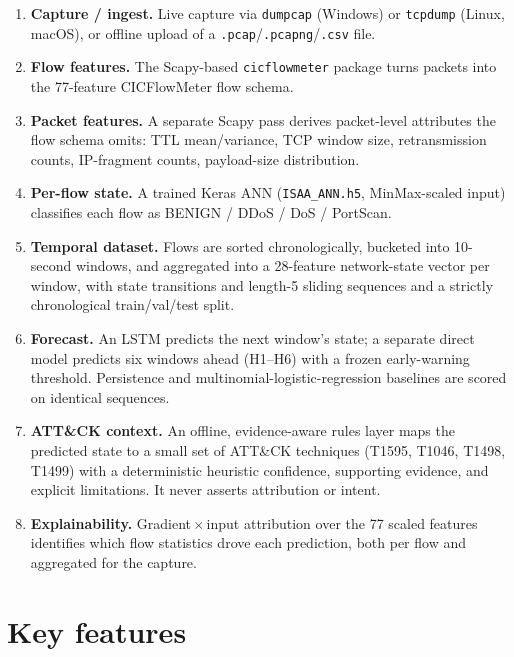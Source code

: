 \documentclass[11pt,a4paper]{article}
\begin{document}
\begin{enumerate}[leftmargin=1.6em,itemsep=3pt]
  \item \textbf{Capture / ingest.} Live capture via \texttt{dumpcap} (Windows)
  or \texttt{tcpdump} (Linux, macOS), or offline upload of a
  \texttt{.pcap}/\texttt{.pcapng}/\texttt{.csv} file.
  \item \textbf{Flow features.} The Scapy-based \texttt{cicflowmeter} package
  turns packets into the 77-feature CICFlowMeter flow schema.
  \item \textbf{Packet features.} A separate Scapy pass derives packet-level
  attributes the flow schema omits: TTL mean/variance, TCP window size,
  retransmission counts, IP-fragment counts, payload-size distribution.
  \item \textbf{Per-flow state.} A trained Keras ANN (\texttt{ISAA\_ANN.h5},
  MinMax-scaled input) classifies each flow as BENIGN / DDoS / DoS / PortScan.
  \item \textbf{Temporal dataset.} Flows are sorted chronologically, bucketed
  into 10-second windows, and aggregated into a 28-feature network-state
  vector per window, with state transitions and length-5 sliding sequences and
  a strictly chronological train/val/test split.
  \item \textbf{Forecast.} An LSTM predicts the next window's state; a separate
  direct model predicts six windows ahead (H1--H6) with a frozen
  early-warning threshold. Persistence and multinomial-logistic-regression
  baselines are scored on identical sequences.
  \item \textbf{ATT\&CK context.} An offline, evidence-aware rules layer maps
  the predicted state to a small set of ATT\&CK techniques
  (T1595, T1046, T1498, T1499) with a deterministic heuristic confidence,
  supporting evidence, and explicit limitations. It never asserts attribution
  or intent.
  \item \textbf{Explainability.} Gradient\,$\times$\,input attribution over the
  77 scaled features identifies which flow statistics drove each prediction,
  both per flow and aggregated for the capture.
\end{enumerate}

\section{Key features}
\end{document}
